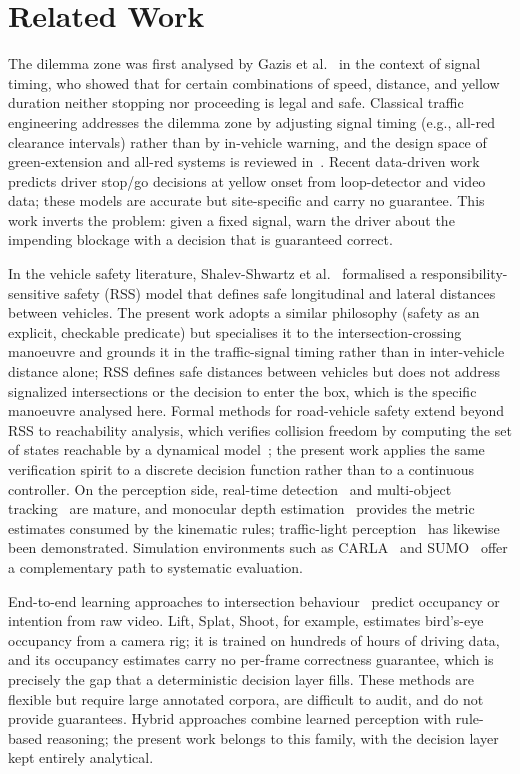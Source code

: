 \documentclass[conference, a4paper]{IEEEtran}
\theoremstyle{plain}
\begin{document}
\section{Related Work}
\label{sec:related}

The dilemma zone was first analysed by Gazis et al.~\cite{gazis1960} in the
context of signal timing, who showed that for certain combinations of speed,
distance, and yellow duration neither stopping nor proceeding is legal and
safe. Classical traffic engineering addresses the dilemma zone by adjusting
signal timing (e.g., all-red clearance intervals) rather than by in-vehicle
warning, and the design space of green-extension and all-red systems is
reviewed in~\cite{zegeer1978}. Recent data-driven work predicts driver
stop/go decisions at yellow onset from loop-detector and video data; these
models are accurate but site-specific and carry no guarantee. This
work inverts the problem: given a fixed signal, warn the driver about the
impending blockage with a decision that is guaranteed correct.

In the vehicle safety literature, Shalev-Shwartz et al.~\cite{shalev2017}
formalised a responsibility-sensitive safety (RSS) model that defines safe
longitudinal and lateral distances between vehicles. The present work adopts
a similar philosophy (safety as an explicit, checkable predicate) but
specialises it to the intersection-crossing manoeuvre and grounds it in the
traffic-signal timing rather than in inter-vehicle distance alone; RSS
defines safe distances between vehicles but does not address signalized
intersections or the decision to enter the box, which is the specific
manoeuvre analysed here. Formal methods for road-vehicle safety extend
beyond RSS to reachability analysis,
which verifies collision freedom by computing the set of states reachable by
a dynamical model~\cite{althoff2014}; the present work applies the same
verification spirit to a discrete decision function rather than to a
continuous controller. On the perception side, real-time
detection~\cite{redmon2016} and multi-object tracking~\cite{wojke2017} are
mature, and monocular depth estimation~\cite{godard2019} provides the metric
estimates consumed by the kinematic rules; traffic-light
perception~\cite{behrendt2017} has likewise been demonstrated. Simulation
environments such as CARLA~\cite{dosovitskiy2017} and
SUMO~\cite{lopez2018} offer a complementary path to systematic evaluation.

End-to-end learning approaches to intersection behaviour~\cite{philion2019}
predict occupancy or intention from raw video. Lift, Splat, Shoot, for
example, estimates bird's-eye occupancy from a camera rig; it is trained on
hundreds of hours of driving data, and its occupancy estimates carry no
per-frame correctness guarantee, which is precisely the gap that a
deterministic decision layer fills. These methods are flexible but require
large annotated corpora, are difficult to audit, and do not provide
guarantees. Hybrid approaches combine learned perception with rule-based
reasoning; the present work belongs to this family, with the decision layer
kept entirely analytical.
\end{document}
